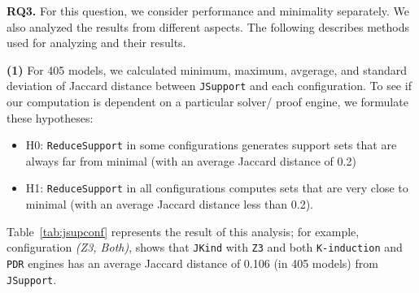 %
%
\vspace{6pt}
\noindent{}
 \vspace{6pt}

\textbf{RQ3.}   For this question, we consider performance and minimality separately.  We also analyzed the results from different aspects. The following describes methods used for analyzing and their results.

\textbf{(1)} For 405 models, we calculated minimum, maximum, avgerage, and standard deviation of Jaccard distance between \texttt{JSupport} and each configuration. To see if our computation is dependent on a particular solver/ proof engine, we formulate these hypotheses:
\begin{itemize}
  \item H0: \texttt{ReduceSupport} in some configurations generates support sets that are always far from minimal (with an average Jaccard distance of 0.2)
  \item H1: \texttt{ReduceSupport} in all configurations computes sets that are very close to minimal (with an average Jaccard distance less than 0.2).
\end{itemize}

Table~\ref{tab:jsupconf} represents the result of this analysis; for example, configuration \emph{(Z3, Both)}, shows that \texttt{JKind} with \texttt{Z3} and both \texttt{K-induction} and \texttt{PDR} engines has an average Jaccard distance of 0.106 (in 405 models) from \texttt{JSupport}.


